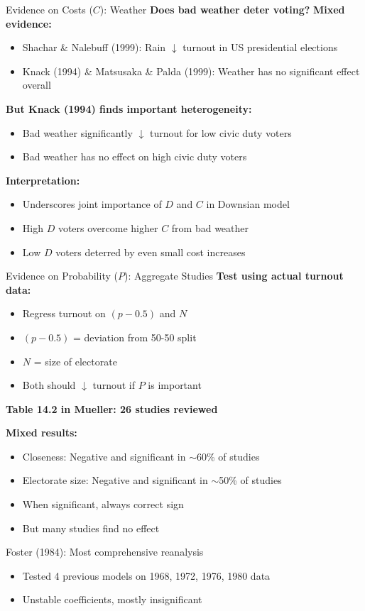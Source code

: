 \documentclass[10pt]{beamer}
\begin{document}
\begin{frame}{Evidence on Costs ($C$): Weather}
\textbf{Does bad weather deter voting?}
\textbf{Mixed evidence:}
\begin{itemize}
\item Shachar \& Nalebuff (1999): Rain $\downarrow$ turnout in US presidential elections
\item Knack (1994) \& Matsusaka \& Palda (1999): Weather has no significant effect overall
\end{itemize}
\textbf{But Knack (1994) finds important heterogeneity:}
\begin{itemize}
\item Bad weather significantly $\downarrow$ turnout for \alert{low civic duty} voters
\item Bad weather has \alert{no effect} on high civic duty voters
\end{itemize}


\textbf{Interpretation:}
\begin{itemize}
\item Underscores joint importance of $D$ and $C$ in Downsian model
\item High $D$ voters overcome higher $C$ from bad weather
\item Low $D$ voters deterred by even small cost increases
\end{itemize}
\end{frame}

\begin{frame}{Evidence on Probability ($P$): Aggregate Studies}
\textbf{Test using actual turnout data:}
\begin{itemize}
\item Regress turnout on $(p - 0.5)$ and $N$
\item $(p - 0.5)$ = deviation from 50-50 split
\item $N$ = size of electorate
\item Both should $\downarrow$ turnout if $P$ is important
\end{itemize}


\textbf{Table 14.2 in Mueller: 26 studies reviewed}


\textbf{Mixed results:}
\begin{itemize}
\item Closeness: Negative and significant in $\sim$60\% of studies
\item Electorate size: Negative and significant in $\sim$50\% of studies
\item When significant, always correct sign
\item But many studies find no effect
\end{itemize}


Foster (1984): Most comprehensive reanalysis
\begin{itemize}
\item Tested 4 previous models on 1968, 1972, 1976, 1980 data
\item Unstable coefficients, mostly insignificant
\end{itemize}
\end{frame}
\end{document}
